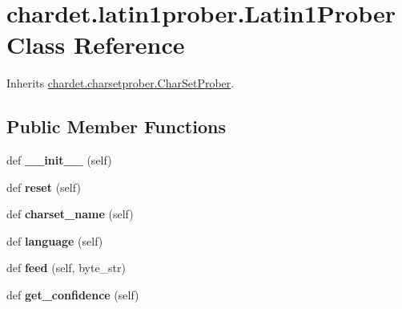 \hypertarget{classchardet_1_1latin1prober_1_1_latin1_prober}{}\section{chardet.\+latin1prober.\+Latin1\+Prober Class Reference}
\label{classchardet_1_1latin1prober_1_1_latin1_prober}


Inherits \hyperlink{classchardet_1_1charsetprober_1_1_char_set_prober}{chardet.\+charsetprober.\+Char\+Set\+Prober}.

\subsection*{Public Member Functions}
\begin{DoxyCompactItemize}
\item 
\mbox{\label{classchardet_1_1latin1prober_1_1_latin1_prober_a9f28678945830f5df5e42ec5c4691d3f}} 
def {\bfseries \+\_\+\+\_\+init\+\_\+\+\_\+} (self)
\item 
\mbox{\label{classchardet_1_1latin1prober_1_1_latin1_prober_a1eb3a45b3480b336299d6c54d4aaa3e2}} 
def {\bfseries reset} (self)
\item 
\mbox{\label{classchardet_1_1latin1prober_1_1_latin1_prober_a872f934fbcdd41840da38e3bb232e3bc}} 
def {\bfseries charset\+\_\+name} (self)
\item 
\mbox{\label{classchardet_1_1latin1prober_1_1_latin1_prober_a6295b666492c5cdf89ccd38760e7e82d}} 
def {\bfseries language} (self)
\item 
\mbox{\label{classchardet_1_1latin1prober_1_1_latin1_prober_acda29f26ba1ea08528ecea81c339c107}} 
def {\bfseries feed} (self, byte\+\_\+str)
\item 
\mbox{\label{classchardet_1_1latin1prober_1_1_latin1_prober_ac432ccc5cb8420fa5bd4a84809926d52}} 
def {\bfseries get\+\_\+confidence} (self)
\end{DoxyCompactItemize}
